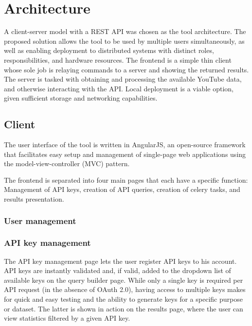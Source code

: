 \section{Architecture}
A client-server model with a REST API was chosen as the tool architecture. The
proposed solution allows the tool to be used by multiple users simultaneously,
as well as enabling deployment to distributed systems with distinct roles,
responsibilities, and hardware resources.
The frontend is a simple thin client whose sole job is relaying commands to a
server and showing the returned results. The server is tasked with obtaining
and processing the available YouTube data, and otherwise interacting with the
API.
Local deployment is a viable option, given sufficient storage and networking
capabilities.


\subsection{Client}
The user interface of the tool is written in AngularJS, an open-source framework
that facilitates easy setup and management of single-page web applications using
the model-view-controller (MVC) pattern.~\cite{architecture:angularjs}

The frontend is separated into four main pages that each have a specific
function: Management of API keys, creation of API queries, creation of celery
tasks, and results presentation.


\subsubsection{User management}


\subsubsection{API key management}

The API key management page lets the user register API keys to his account.
API keys are instantly validated and, if valid, added to the dropdown list of
available keys on the query builder page.
While only a single key is required per API request (in the absence of OAuth
2.0), having access to multiple keys makes for quick and easy testing and the
ability to generate keys for a specific purpose or dataset. The latter is
shown in action on the results page, where the user can view statistics filtered
by a given API key.


